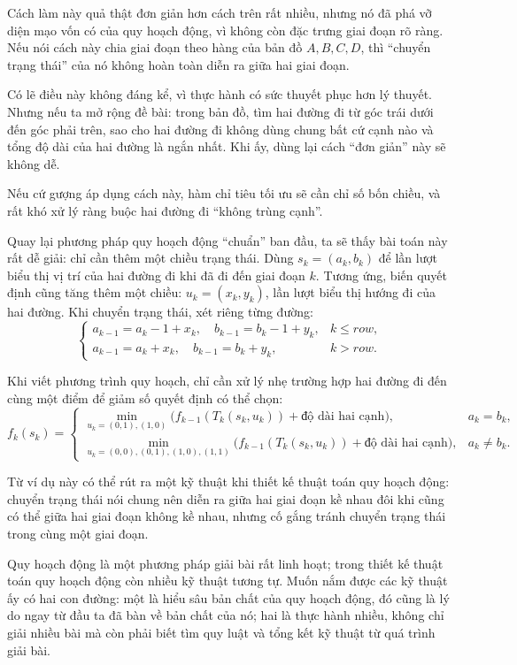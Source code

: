 \documentclass[11pt]{article}
\begin{document}
Cách làm này quả thật đơn giản hơn cách trên rất nhiều, nhưng nó đã phá vỡ
diện mạo vốn có của quy hoạch động, vì không còn đặc trưng giai đoạn rõ ràng.
Nếu nói cách này chia giai đoạn theo hàng của bản đồ \(A,B,C,D\), thì
``chuyển trạng thái'' của nó không hoàn toàn diễn ra giữa hai giai đoạn.

Có lẽ điều này không đáng kể, vì thực hành có sức thuyết phục hơn lý thuyết.
Nhưng nếu ta mở rộng đề bài: trong bản đồ, tìm hai đường đi từ góc trái dưới
đến góc phải trên, sao cho hai đường đi không dùng chung bất cứ cạnh nào và
tổng độ dài của hai đường là ngắn nhất. Khi ấy, dùng lại cách ``đơn giản''
này sẽ không dễ.

Nếu cứ gượng áp dụng cách này, hàm chỉ tiêu tối ưu sẽ cần chỉ số bốn chiều,
và rất khó xử lý ràng buộc hai đường đi ``không trùng cạnh''.

Quay lại phương pháp quy hoạch động ``chuẩn'' ban đầu, ta sẽ thấy bài toán
này rất dễ giải: chỉ cần thêm một chiều trạng thái. Dùng
\(s_k=(a_k,b_k)\) để lần lượt biểu thị vị trí của hai đường đi khi đã đi đến
giai đoạn \(k\). Tương ứng, biến quyết định cũng tăng thêm một chiều:
\(u_k=(x_k,y_k)\), lần lượt biểu thị hướng đi của hai đường. Khi chuyển trạng
thái, xét riêng từng đường:
\[
\begin{cases}
a_{k-1}=a_k-1+x_k,\quad b_{k-1}=b_k-1+y_k, & k\le \mathit{row},\\
a_{k-1}=a_k+x_k,\quad b_{k-1}=b_k+y_k, & k>\mathit{row}.
\end{cases}
\]

Khi viết phương trình quy hoạch, chỉ cần xử lý nhẹ trường hợp hai đường đi
đến cùng một điểm để giảm số quyết định có thể chọn:
\[
f_k(s_k)=
\begin{cases}
\displaystyle
\min_{u_k=(0,1),(1,0)}
\bigl(f_{k-1}(T_k(s_k,u_k))+\text{độ dài hai cạnh}\bigr),
& a_k=b_k,\\[0.8em]
\displaystyle
\min_{u_k=(0,0),(0,1),(1,0),(1,1)}
\bigl(f_{k-1}(T_k(s_k,u_k))+\text{độ dài hai cạnh}\bigr),
& a_k\ne b_k.
\end{cases}
\]

Từ ví dụ này có thể rút ra một kỹ thuật khi thiết kế thuật toán quy hoạch
động: chuyển trạng thái nói chung nên diễn ra giữa hai giai đoạn kề nhau
đôi khi cũng có thể giữa hai giai đoạn không kề nhau, nhưng cố gắng tránh
chuyển trạng thái trong cùng một giai đoạn.

Quy hoạch động là một phương pháp giải bài rất linh hoạt; trong thiết kế
thuật toán quy hoạch động còn nhiều kỹ thuật tương tự. Muốn nắm được các kỹ
thuật ấy có hai con đường: một là hiểu sâu bản chất của quy hoạch động, đó
cũng là lý do ngay từ đầu ta đã bàn về bản chất của nó; hai là thực hành
nhiều, không chỉ giải nhiều bài mà còn phải biết tìm quy luật và tổng kết kỹ
thuật từ quá trình giải bài.
\end{document}

